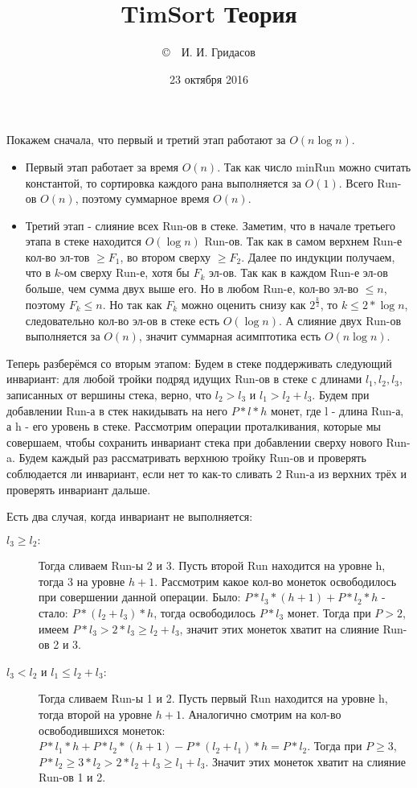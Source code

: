 \documentclass[12pt]{article}
\title{TimSort Теория}
\date{23 октября 2016}
\author{\copyright~~И. И. Гридасов}
\begin{document}
\maketitle
Покажем сначала, что первый и третий этап работают за $O(n\log n)$.

\begin{itemize}
	\item Первый этап работает за время $O(n)$. 
		Так как число minRun можно считать константой, то сортировка каждого рана выполняется за $O(1)$.
		Всего Run-ов $O(n)$, поэтому суммарное время $O(n)$.
	\item Третий этап - слияние всех Run-ов в стеке.
		Заметим, что в начале третьего этапа в стеке находится $O(\log n)$ Run-ов.
		Так как в самом верхнем Run-е кол-во эл-тов $\geqslant F_1$, 
		во втором сверху $\geqslant F_2$.
		Далее по индукции получаем, что в $k$-ом сверху Run-е, хотя бы $F_k$ эл-ов.
		Так как в каждом Run-е эл-ов больше, чем сумма двух выше его.
		Но в любом Run-е, кол-во эл-во $\leqslant n$, поэтому $F_k \leqslant n$.
		Но так как $F_k$ можно оценить снизу как $2^{\frac{k}{2}}$, то
		$k \leqslant 2 * \log n$, следовательно кол-во эл-ов в стеке есть $O(\log n)$.
		А слияние двух Run-ов выполняется за $O(n)$, значит суммарная асимптотика есть $O(n\log n)$.
\end{itemize}

Теперь разберёмся со вторым этапом:
Будем в стеке поддерживать следующий инвариант:
для любой тройки подряд идущих Run-ов в стеке с длинами $l_1, l_2, l_3$, записанных от вершины стека,
верно, что $l_2 > l_3$ и $l_1 > l_2 + l_3$.
Будем при добавлении Run-а в стек накидывать на него $P*l*h$ монет, 
где l - длина Run-а, а h - его уровень в стеке.
Рассмотрим операции проталкивания, которые мы совершаем, чтобы 
сохранить инвариант стека при добавлении сверху нового Run-a.
Будем каждый раз рассматривать верхнюю тройку Run-ов и проверять соблюдается ли инвариант,
если нет то как-то сливать 2 Run-а из верхних трёх и проверять инвариант дальше.

Есть два случая, когда инвариант не выполняется:
\begin{description}
	\item[$l_3 \geqslant l_2:$]
		Тогда сливаем Run-ы 2 и 3.
		Пусть второй Run находится на уровне h, тогда 3 на уровне $h+1$.
		Рассмотрим какое кол-во монеток освободилось при совершении данной операции.
		Было: $P*l_3*(h+1) + P*l_2*h$ - стало: $P*(l_2+l_3)*h$, тогда освободилось $P*l_3$ монет.
		Тогда при $P>2$, имеем $P*l_3 > 2*l_3 \geqslant l_2 + l_3$, 
		значит этих монеток хватит на слияние Run-ов 2 и 3.
	\item[$l_3 < l_2$ и $l_1 \leqslant l_2 + l_3:$]
		Тогда сливаем Run-ы 1 и 2.
		Пусть первый Run находится на уровне h, тогда второй на уровне $h+1$.
		Аналогично смотрим на кол-во освободившихся монеток:
		$P*l_1*h + P*l_2*(h+1) - P*(l_2+l_1)*h =  P*l_2$. 
		Тогда при $P\geqslant3$, $P*l_2\geqslant3*l_2>2*l_2+l_3\geqslant l_1+l_3$.
		Значит этих монеток хватит на слияние Run-ов 1 и 2. 
\end{description}
\end{document}

